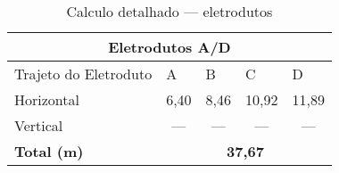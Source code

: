 \begin{table}[h!]
\caption{Calculo detalhado --- eletrodutos}
\label{tab7}
\begin{center}
	\renewcommand{\arraystretch}{1.5}
\begin{tabular}{|l|c|c|c|c|}
	\hline
	\multicolumn{5}{|c|}{\textbf{Eletrodutos A/D}}                                                                            \\ \hline
	Trajeto do Eletroduto & \multicolumn{1}{l|}{A} & \multicolumn{1}{l|}{B} & \multicolumn{1}{l|}{C} & \multicolumn{1}{l|}{D} \\ \hline
	Horizontal            & 6,40                   & 8,46                  & 10,92                  & 11,89                   \\ \hline
	Vertical              & ---                    & ---                    & ---                    & ---                    \\ \hline
	\textbf{Total (m)}    & \multicolumn{4}{c|}{\textbf{37,67}}                                                               \\ \hline
\end{tabular}
\end{center}
\end{table}
